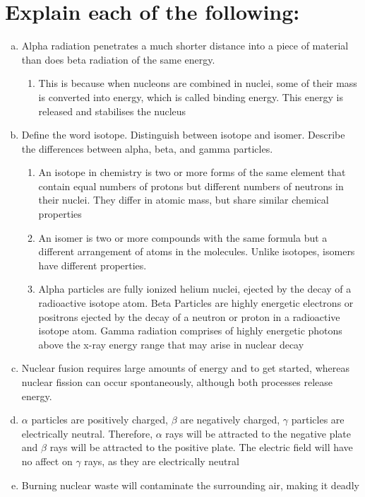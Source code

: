 \documentclass[11pt]{article}
\begin{document}
\section{Explain each of the following:}
\label{sec:org7a39971}
\begin{enumerate}[(a)]
\item Alpha radiation penetrates a much shorter distance into a piece of material than does beta radiation of the same energy.
\begin{enumerate}
\item This is because when nucleons are combined in nuclei, some of their mass is converted into energy, which is called binding energy. This energy is released and stabilises the nucleus
\end{enumerate}

\item Define the word isotope. Distinguish between isotope and isomer. Describe the differences between alpha, beta, and gamma particles.
\begin{enumerate}
\item An isotope in chemistry is two or more forms of the same element that contain equal numbers of protons but different numbers of neutrons in their nuclei. They differ in atomic mass, but share similar chemical properties
\item An isomer is two or more compounds with the same formula but a different arrangement of atoms in the molecules. Unlike isotopes, isomers have different properties.
\item Alpha particles are fully ionized helium nuclei, ejected by the decay
of a radioactive isotope atom. Beta Particles are highly energetic
electrons or positrons ejected by the decay of a neutron or proton in a radioactive isotope atom. Gamma radiation comprises of highly energetic photons above the x-ray energy range that may arise in nuclear decay
\end{enumerate}

\item Nuclear fusion requires large amounts of energy and to get started, whereas nuclear fission can occur spontaneously, although both processes release energy.

\item \(\alpha\) particles are positively charged, \(\beta\) are negatively charged, \(\gamma\) particles
are electrically neutral. Therefore, \(\alpha\) rays will be attracted to the
negative plate and \(\beta\) rays will be attracted to the positive plate. The electric field will have no affect on \(\gamma\) rays, as they are electrically neutral

\item Burning nuclear waste will contaminate the surrounding air, making it
deadly
\end{enumerate}
\end{document}

